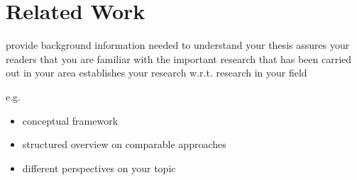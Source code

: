 \chapter{Related Work}
\label{sec:Related Work}

provide background information needed to understand your thesis
assures your readers that you are familiar with the important research that has been carried out in your area
establishes your research w.r.t. research in your field

e.g.\
\begin{itemize}
  \item conceptual framework
  \item structured overview on comparable approaches
  \item different perspectives on your topic
\end{itemize}

 \cite{EckartDeCastilho2014} 